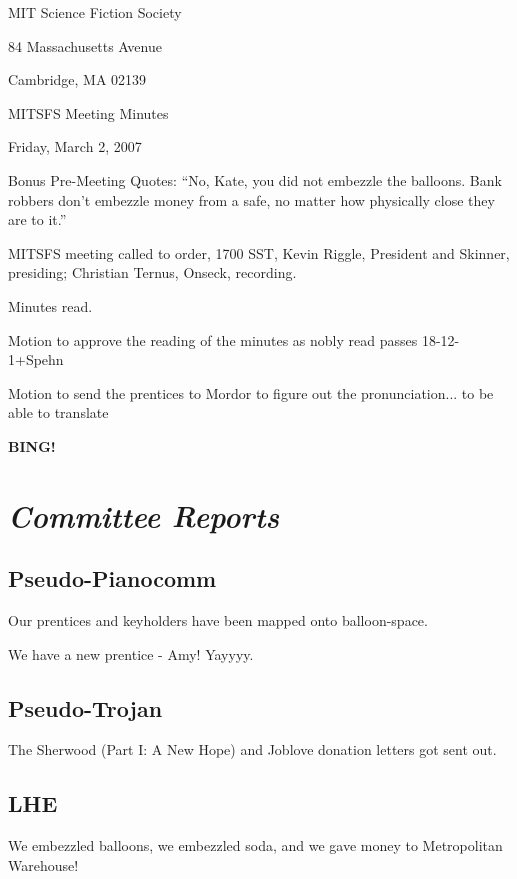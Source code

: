\documentclass[10pt]{article}
\newcommand{\bing}{{\bf BING!} }
\newcommand{\goto}[1]{\bing \vskip 12pt \section*{{\em{#1}}}}
\begin{document}
\begin{center}

MIT Science Fiction Society

84 Massachusetts Avenue

Cambridge, MA 02139

\vspace{12pt}

MITSFS Meeting Minutes

Friday, March 2, 2007

\end{center}

\vspace{18pt}

\setlength{\parskip}{6pt}

\noindent

Bonus Pre-Meeting Quotes: ``No, Kate, you did not embezzle the balloons.  Bank robbers don't
embezzle money from a safe, no matter how physically close they are to it.''

MITSFS meeting called to order, 1700 SST,
Kevin Riggle, President and Skinner, presiding; Christian Ternus, Onseck, recording.

Minutes read.

Motion to approve the reading of the minutes as nobly read passes 18-12-1+Spehn

Motion to send the prentices to Mordor to figure out the pronunciation... to be able to translate 

\goto{Committee Reports}

\subsection*{Pseudo-Pianocomm}

Our prentices and keyholders have been mapped onto balloon-space.

We have a new prentice - Amy! Yayyyy.

\subsection*{Pseudo-Trojan}

The Sherwood (Part I: A New Hope) and Joblove donation letters got sent out. 

\subsection*{LHE}

We embezzled balloons, we embezzled soda, and we gave money to Metropolitan Warehouse!
\end{document}
